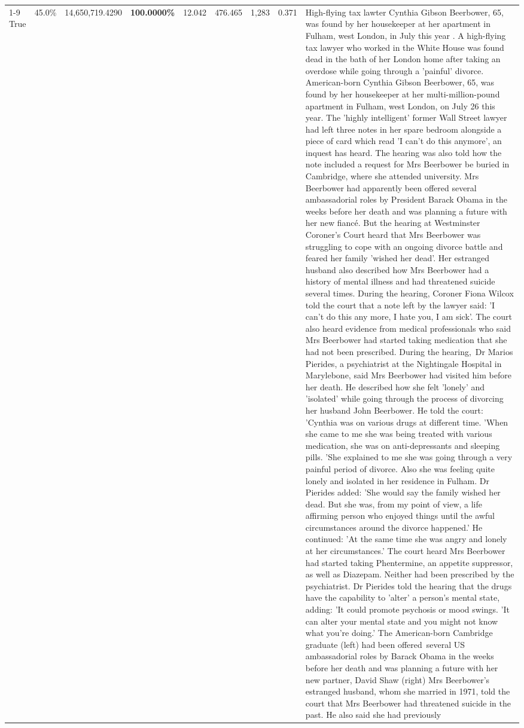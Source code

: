 \begin{table}[H]
\begin{tabular}{lllrlllll}
\cline{1-9}
True & 45.0\% & 14,650,719.4290 & \bfseries \color{red} 100.0000\% & 12.042 & 476.465 & 1,283 & 0.371 & High-flying tax lawter Cynthia Gibson Beerbower, 65, was found by her housekeeper at her apartment in Fulham, west London, in July this year . A high-flying tax lawyer who worked in the White House was found dead in the bath of her London home after taking an overdose while going through a 'painful' divorce. American-born Cynthia Gibson Beerbower, 65, was found by her housekeeper at her multi-million-pound apartment in Fulham, west London, on July 26 this year. The 'highly intelligent' former Wall Street lawyer had left three notes in her spare bedroom alongside a piece of card which read 'I can't do this anymore', an inquest has heard. The hearing was also told how the note included a request for Mrs Beerbower be buried in Cambridge, where she attended university. Mrs Beerbower had apparently been offered several ambassadorial roles by President Barack Obama in the weeks before her death and was planning a future with her new fiancé. But the hearing at Westminster Coroner's Court heard that Mrs Beerbower was struggling to cope with an ongoing divorce battle and feared her family 'wished her dead'. Her estranged husband also described how Mrs Beerbower had a history of mental illness and had threatened suicide several times. During the hearing, Coroner Fiona Wilcox told the court that a note left by the lawyer said: 'I can't do this any more, I hate you, I am sick'. The court also heard evidence from medical professionals who said Mrs Beerbower had started taking medication that she had not been prescribed. During the hearing, Dr Marios Pierides, a psychiatrist at the Nightingale Hospital in Marylebone, said Mrs Beerbower had visited him before her death. He described how she felt 'lonely' and 'isolated' while going through the process of divorcing her husband John Beerbower. He told the court: 'Cynthia was on various drugs at different time. 'When she came to me she was being treated with various medication, she was on anti-depressants and sleeping pills. 'She explained to me she was going through a very painful period of divorce. Also she was feeling quite lonely and isolated in her residence in Fulham. Dr Pierides added: 'She would say the family wished her dead. But she was, from my point of view, a life affirming person who enjoyed things until the awful circumstances around the divorce happened.' He continued: 'At the same time she was angry and lonely at her circumstances.' The court heard Mrs Beerbower had started taking Phentermine, an appetite suppressor, as well as Diazepam. Neither had been prescribed by the psychiatrist. Dr Pierides told the hearing that the drugs have the capability to 'alter' a person's mental state, adding: 'It could promote psychosis or mood swings. 'It can alter your mental state and you might not know what you're doing.' The American-born Cambridge graduate (left) had been offered several US ambassadorial roles by Barack Obama in the weeks before her death and was planning a future with her new partner, David Shaw (right) Mrs Beerbower's estranged husband, whom she married in 1971, told the court that Mrs Beerbower had threatened suicide in the past. He also said she had previously 
\end{tabular}
\end{table}
